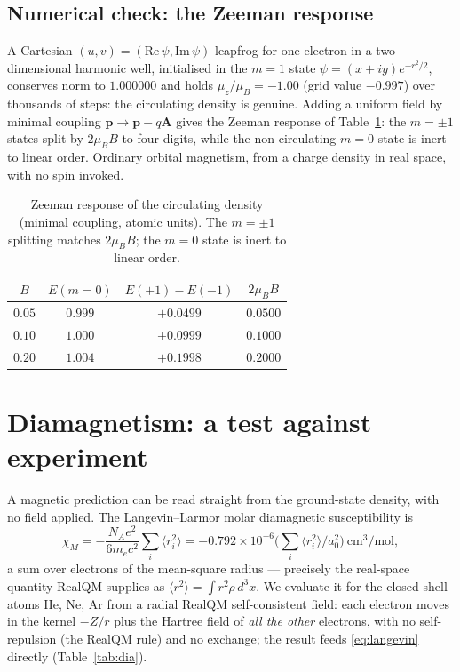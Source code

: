 \documentclass[11pt]{article}
\begin{document}
\subsection{Numerical check: the Zeeman response}

A Cartesian $(u,v)=(\mathrm{Re}\,\psi,\mathrm{Im}\,\psi)$ leapfrog for one electron in a two-dimensional harmonic
well, initialised in the $m=1$ state $\psi=(x+iy)e^{-r^2/2}$, conserves norm to $1.000000$ and holds
$\mu_z/\mu_B=-1.00$ (grid value $-0.997$) over thousands of steps: the circulating density is genuine. Adding a
uniform field by minimal coupling $\mathbf p\to\mathbf p-q\mathbf A$ gives the Zeeman response of
Table~\ref{tab:zeeman}: the $m=\pm1$ states split by $2\mu_B B$ to four digits, while the non-circulating $m=0$
state is inert to linear order. Ordinary orbital magnetism, from a charge density in real space, with no spin
invoked.

\begin{table}[h]
\centering
\begin{tabular}{cccc}
\toprule
$B$ & $E(m{=}0)$ & $E(+1)-E(-1)$ & $2\mu_B B$ \\
\midrule
$0.05$ & $0.999$ & $+0.0499$ & $0.0500$ \\
$0.10$ & $1.000$ & $+0.0999$ & $0.1000$ \\
$0.20$ & $1.004$ & $+0.1998$ & $0.2000$ \\
\bottomrule
\end{tabular}
\caption{Zeeman response of the circulating density (minimal coupling, atomic units). The $m=\pm1$ splitting
matches $2\mu_B B$; the $m=0$ state is inert to linear order.}
\label{tab:zeeman}
\end{table}

\section{Diamagnetism: a test against experiment}
\label{sec:dia}

A magnetic prediction can be read straight from the ground-state density, with no field applied. The
Langevin--Larmor molar diamagnetic susceptibility is
\begin{equation}
\chi_M = -\frac{N_A e^2}{6 m_e c^2}\sum_i\langle r_i^2\rangle
       = -0.792\times10^{-6}\Big(\textstyle\sum_i\langle r_i^2\rangle/a_0^2\Big)\ \mathrm{cm^3/mol},
\label{eq:langevin}
\end{equation}
a sum over electrons of the mean-square radius --- precisely the real-space quantity RealQM supplies as
$\langle r^2\rangle=\int r^2\rho\,d^3x$. We evaluate it for the closed-shell atoms He, Ne, Ar from a radial RealQM
self-consistent field: each electron moves in the kernel $-Z/r$ plus the Hartree field of \emph{all the other}
electrons, with no self-repulsion (the RealQM rule) and no exchange; the result feeds
\eqref{eq:langevin} directly (Table~\ref{tab:dia}).
\end{document}
